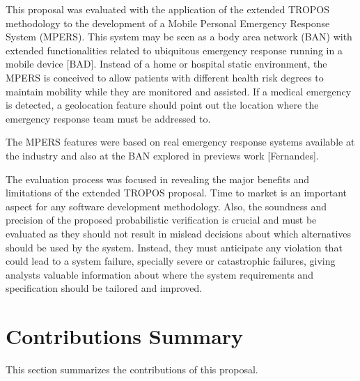 This proposal was evaluated with the application of the extended TROPOS methodology to the development of a Mobile Personal Emergency Response System (MPERS). This system may be seen as a body area network (BAN) with extended functionalities related to ubiquitous emergency response running in a mobile device [BAD]. Instead of a home or hospital static environment, the MPERS is conceived to allow patients with different health risk degrees to maintain mobility while they are monitored and assisted. If a medical emergency is detected, a geolocation feature should point out the location where the emergency response team must be addressed to. 

The MPERS features were based on real emergency response systems available at the industry and also at the BAN explored in previews work [Fernandes]. 

The evaluation process was focused in revealing the major benefits and limitations of the extended TROPOS proposal. Time to market is an important aspect for any software development methodology. Also, the soundness and precision of the proposed probabilistic verification is crucial and must be evaluated as they should not result in mislead decisions about which alternatives should be used by the system. Instead, they must anticipate any violation that could lead to a system failure, specially severe or catastrophic failures, giving analysts valuable information about where the system requirements and specification should be tailored and improved.

\section{Contributions Summary}

This section summarizes the contributions of this proposal.


